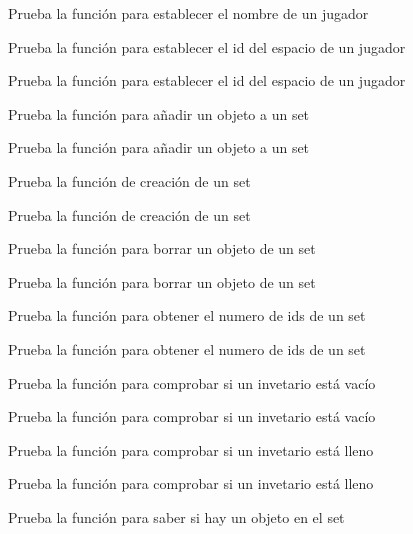 \begin{DoxyRefList}
Prueba la función para establecer el nombre de un jugador  
\item[\label{test__test000211}%
\Hypertarget{test__test000211}%
Member \hyperlink{player__test_8h_ae6151348bf59b8e4e4ae4c2204ac3e36}{test1\+\_\+player\+\_\+set\+\_\+space\+\_\+id} ()]Prueba la función para establecer el id del espacio de un jugador 

Prueba la función para establecer el id del espacio de un jugador  
\item[\label{test__test000231}%
\Hypertarget{test__test000231}%
Member \hyperlink{set__test_8h_a014ebe1b46af5ea318143fc61894d9c0}{test1\+\_\+set\+\_\+add} ()]Prueba la función para añadir un objeto a un set 

Prueba la función para añadir un objeto a un set  
\item[\label{test__test000227}%
\Hypertarget{test__test000227}%
Member \hyperlink{set__test_8h_a6f654ab4b44e8a9b9cedfb78c378a5d7}{test1\+\_\+set\+\_\+create} ()]Prueba la función de creación de un set 

Prueba la función de creación de un set  
\item[\label{test__test000228}%
\Hypertarget{test__test000228}%
Member \hyperlink{set__test_8h_a4bec0c0f80b12fc9cabf5ed5ac6d1235}{test1\+\_\+set\+\_\+delete\+\_\+element} ()]Prueba la función para borrar un objeto de un set 

Prueba la función para borrar un objeto de un set  
\item[\label{test__test000239}%
\Hypertarget{test__test000239}%
Member \hyperlink{set__test_8h_a9a82ad51eca0f4cd5faf028e23b68bb3}{test1\+\_\+set\+\_\+get\+\_\+num\+\_\+ids} ()]Prueba la función para obtener el numero de ids de un set 

Prueba la función para obtener el numero de ids de un set  
\item[\label{test__test000235}%
\Hypertarget{test__test000235}%
Member \hyperlink{set__test_8h_a0d1505a528700bc71c89a71c88d6b21e}{test1\+\_\+set\+\_\+is\+\_\+empty} ()]Prueba la función para comprobar si un invetario está vacío 

Prueba la función para comprobar si un invetario está vacío  
\item[\label{test__test000233}%
\Hypertarget{test__test000233}%
Member \hyperlink{set__test_8h_a7bae6941906dd98c8d8ffb2da8a409f6}{test1\+\_\+set\+\_\+is\+\_\+full} ()]Prueba la función para comprobar si un invetario está lleno 

Prueba la función para comprobar si un invetario está lleno  
\item[\label{test__test000237}%
\Hypertarget{test__test000237}%
Member \hyperlink{set__test_8h_a44730a3c8aea8b09c4807d5a11794069}{test1\+\_\+set\+\_\+is\+\_\+id\+\_\+in} ()]Prueba la función para saber si hay un objeto en el set 


\end{DoxyRefList}
